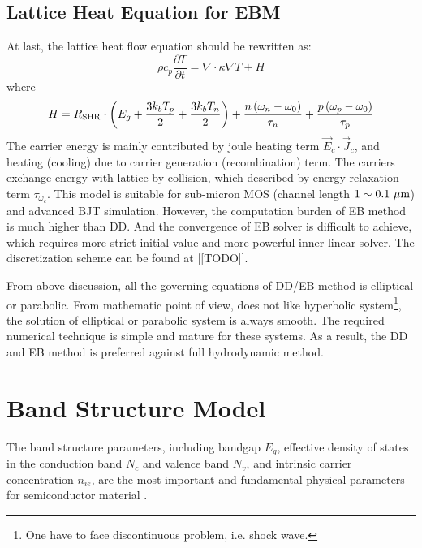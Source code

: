 \documentclass[oneside,12pt]{cgd_book}
\begin{document}
\subsection{Lattice Heat Equation for EBM}\label{Heat flow equation+EBML3}At last, the lattice heat flow equation should be rewritten as:
\begin{equation}
\rho c_p \frac{\partial T}{\partial t} = \nabla \cdot \kappa \nabla T + H
\end{equation}
where
\begin{equation}
H = R_{\rm SHR} \cdot \left( E_g + \frac{3k_b T_p } {2} + \frac{3k_b T_n } {2} \right) + \frac{
        n\left( \omega _n - \omega _0 \right)} {\tau _n } + \frac{p\left( \omega _p - \omega _0 \right)}{\tau _p
        }
\end{equation}
The carrier energy is mainly contributed by joule heating term $\vec{E}_c\cdot
      \vec{J}_c$, and heating (cooling) due to carrier generation (recombination) term. The carriers exchange
      energy with lattice by collision, which described by energy relaxation term
$\tau_{\omega
      _c}$. This model is suitable for sub-micron MOS (channel length
$1\sim 0.1
      ~\mu \rm m$) and advanced BJT simulation. However, the computation burden of EB method is much higher than
      DD. And the convergence of EB solver is difficult to achieve, which requires more strict initial value and more
      powerful inner linear solver. The discretization scheme can be found at [[TODO]].
\par
From above discussion, all the governing equations of DD/EB method is elliptical or parabolic. From
      mathematic point of view, does not like hyperbolic system\footnote{
One have to face discontinuous problem, i.e. shock wave.
\par
}, the solution of elliptical or parabolic system is always smooth. The required numerical technique
      is simple and mature for these systems. As a result, the DD and EB method is preferred against full hydrodynamic
      method.
\par
\section{Band Structure Model}
The band structure parameters, including bandgap $E_g$, effective density of
      states in the conduction band $N_c$ and valence band $N_v$, and intrinsic carrier concentration
$n_{ie}$, are the most
      important and fundamental physical parameters for semiconductor material
\cite{Sze1981}.
\par
\end{document}
